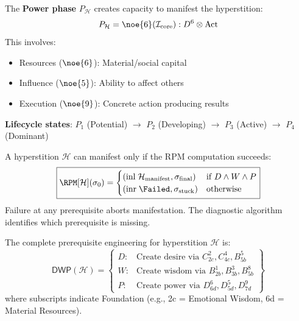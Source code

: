 \begin{definition}
\label{def:power-engineering}
The \textbf{Power phase} $P_\mathcal{H}$ creates capacity to manifest the hyperstition:
\[
P_\mathcal{H} = \noe{6}(\mathcal{I}_{\text{core}}) : D^6 \otimes \text{Act}
\]
This involves:
\begin{itemize}
    \item Resources ($\noe{6}$): Material/social capital
    \item Influence ($\noe{5}$): Ability to affect others
    \item Execution ($\noe{9}$): Concrete action producing results
\end{itemize}
\textbf{Lifecycle states}: $P_1$ (Potential) $\to$ $P_2$ (Developing) $\to$ $P_3$ (Active) $\to$ $P_4$ (Dominant)
\end{definition}

\begin{theorem}
\label{thm:rpm-satisfaction}
A hyperstition $\mathcal{H}$ can manifest only if the RPM computation succeeds:
\begin{equation}
\boxed{
\RPM[\mathcal{H}](\sigma_0) =
\begin{cases}
(\mathrm{inl}\; \mathcal{H}_{\text{manifest}}, \sigma_{\text{final}}) & \text{if } D \land W \land P \\
(\mathrm{inr}\; \Failed, \sigma_{\text{stuck}}) & \text{otherwise}
\end{cases}
}
\end{equation}
Failure at any prerequisite aborts manifestation. The diagnostic algorithm identifies which prerequisite is missing.
\end{theorem}

\begin{definition}
\label{def:prerequisite-eq}
The complete prerequisite engineering for hyperstition $\mathcal{H}$ is:
\begin{equation}
\boxed{
\mathsf{DWP}(\mathcal{H}) =
\left\{
\begin{array}{ll}
D: & \text{Create desire via } C^2_{2c}, C^4_{4c}, B^5_{5b} \\
W: & \text{Create wisdom via } B^1_{2b}, B^3_{3b}, B^8_{5b} \\
P: & \text{Create power via } D^6_{6d}, D^5_{5d}, D^9_{7d}
\end{array}
\right\}
}
\end{equation}
where subscripts indicate Foundation (e.g., 2c = Emotional Wisdom, 6d = Material Resources).
\end{definition}

